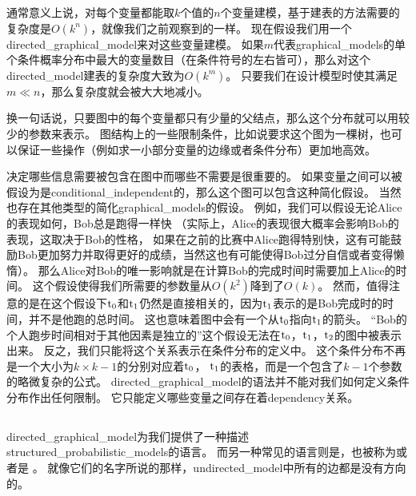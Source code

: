 通常意义上说，对每个变量都能取$k$个值的$n$个变量建模，基于建表的方法需要的复杂度是$O(k^n)$，就像我们之前观察到的一样。
现在假设我们用一个\gls{directed_graphical_model}来对这些变量建模。
如果$m$代表\gls{graphical_models}的单个条件概率分布中最大的变量数目（在条件符号的左右皆可），那么对这个\gls{directed_model}建表的复杂度大致为$O(k^m)$。
只要我们在设计模型时使其满足$m\ll n$，那么复杂度就会被大大地减小。


换一句话说，只要图中的每个变量都只有少量的父结点，那么这个分布就可以用较少的参数来表示。
图结构上的一些限制条件，比如说要求这个图为一棵树，也可以保证一些操作（例如求一小部分变量的边缘或者条件分布）更加地高效。



决定哪些信息需要被包含在图中而哪些不需要是很重要的。
如果变量之间可以被假设为是\gls{conditional_independent}的，那么这个图可以包含这种简化假设。
当然也存在其他类型的简化\gls{graphical_models}的假设。
例如，我们可以假设无论Alice的表现如何，Bob总是跑得一样快
（实际上，Alice的表现很大概率会影响Bob的表现，这取决于Bob的性格，
如果在之前的比赛中Alice跑得特别快，这有可能鼓励Bob更加努力并取得更好的成绩，当然这也有可能使得Bob过分自信或者变得懒惰）。
那么Alice对Bob的唯一影响就是在计算Bob的完成时间时需要加上Alice的时间。
这个假设使得我们所需要的参数量从$O(k^2)$降到了$O(k)$。
然而，值得注意的是在这个假设下$\mathrm{t}_0$和$\mathrm{t}_1$仍然是直接相关的，因为$\mathrm{t}_1$表示的是Bob完成时的时间，并不是他跑的总时间。
这也意味着图中会有一个从$\mathrm{t}_0$指向$\mathrm{t}_1$的箭头。
``Bob的个人跑步时间相对于其他因素是独立的''这个假设无法在$\mathrm{t}_0$，$\mathrm{t}_1$，$\mathrm{t}_2$的图中被表示出来。
反之，我们只能将这个关系表示在条件分布的定义中。
这个条件分布不再是一个大小为$k\times k-1$的分别对应着$\mathrm{t}_0$，  $\mathrm{t}_1$的表格，而是一个包含了$k-1$个参数的略微复杂的公式。
\gls{directed_graphical_model}的语法并不能对我们如何定义条件分布作出任何限制。
它只能定义哪些变量之间存在着\gls{dependency}关系。



\subsection{}
\label{sec:undirected_models}


\gls{directed_graphical_model}为我们提供了一种描述\gls{structured_probabilistic_models}的语言。
而另一种常见的语言则是，也被称为或者是 \citep{kindermann-book-1980}。
就像它们的名字所说的那样，\gls{undirected_model}中所有的边都是没有方向的。


